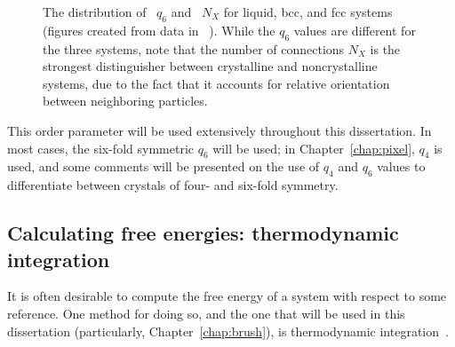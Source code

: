 \begin{figure}
	\begin{center}

	\end{center}
	\caption[The distribution of $q_6$ and $N_X$ for liquid, bcc, and fcc systems]{The distribution of~ $q_6$ and~ $N_X$ for liquid, bcc, and fcc systems (figures created from data in \citeauthor{tenwolde2}~\cite{tenwolde2}).  While the $q_6$ values are different for the three systems, note that the number of connections $N_X$ is the strongest distinguisher between crystalline and noncrystalline systems, due to the fact that it accounts for relative orientation between neighboring particles.}\label{fig:q6dist}
\end{figure}

This order parameter will be used extensively throughout this dissertation.
In most cases, the six-fold symmetric $q_6$ will be used; in Chapter~\ref{chap:pixel}, $q_4$ is used, and some comments will be presented on the use of $q_4$ and $q_6$ values to differentiate between crystals of four- and six-fold symmetry.

\subsection{Calculating free energies: thermodynamic integration}\label{sec:thermint}
It is often desirable to compute the free energy of a system with respect to some reference.
One method for doing so, and the one that will be used in this dissertation (particularly, Chapter~\ref{chap:brush}), is thermodynamic integration~\cite{FrenkelBook}.

